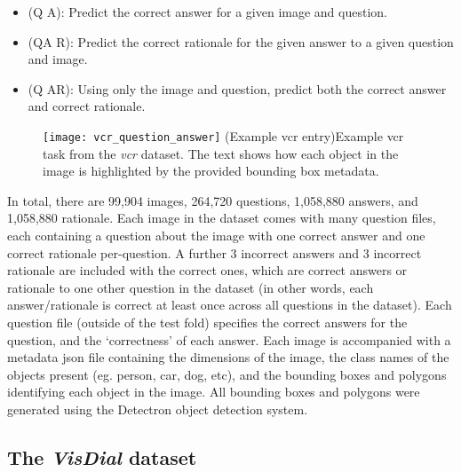 \begin{itemize}\label{list:vcr_task_types}
    \item (Q \rightarrow A): Predict the correct answer for a given image and question.
    \item (QA \rightarrow R): Predict the correct rationale for the given answer to a given question and image.
    \item (Q \rightarrow AR): Using only the image and question, predict both the correct answer and correct rationale.
\end{itemize}

\begin{figure}[htbp]
    \centering
    \texttt{[image: vcr\_question\_answer]}
    \captionsource(Example \acrshort{vcr} entry){Example \acrshort{vcr} task from the \textit{\acrshort{vcr}} dataset. The text shows how each object in the image is highlighted by the provided bounding box metadata. \label{fig:vcr_question_answer}}{\citeauthor{zellers_recognition_2019}\cite{zellers_recognition_2019}}
\end{figure}

In total, there are 99,904 images, 264,720 questions, 1,058,880 answers, and 1,058,880 rationale.
Each image in the dataset comes with many question files, each containing a question about the image with one correct answer and one correct rationale per-question.
A further 3 incorrect answers and 3 incorrect rationale are included with the correct ones, which are correct answers or rationale to one other question in the dataset (in other words, each answer/rationale is correct at least once across all questions in the dataset).
Each question file (outside of the test fold) specifies the correct answers for the question, and the `correctness' of each answer.
Each image is accompanied with a metadata json file containing the dimensions of the image, the class names of the objects present (eg. person, car, dog, etc), and the bounding boxes and polygons identifying each object in the image.
All bounding boxes and polygons were generated using the Detectron object detection system\cite{Detectron2018}.

\subsection{The \textit{VisDial} dataset}
\label{subsec:visdial_dataset}

